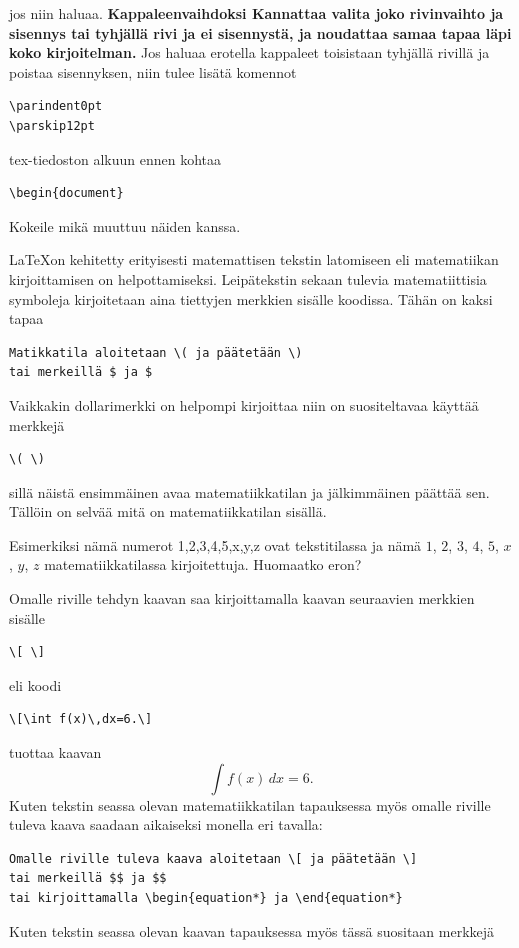 \documentclass[a4paper,12 pt]{article}
\theoremstyle{plain}
\theoremstyle{definition}
\theoremstyle{remark}
\numberwithin{equation}{section}
\numberwithin{figure}{section}
\begin{document}
\noindent jos niin haluaa. \textbf{Kappaleenvaihdoksi Kannattaa valita joko rivinvaihto ja sisennys tai tyhjällä rivi ja ei sisennystä, ja noudattaa samaa tapaa läpi koko kirjoitelman.} Jos haluaa erotella kappaleet toisistaan tyhjällä rivillä ja poistaa sisennyksen, niin tulee lisätä komennot

\begin{verbatim}
\parindent0pt
\parskip12pt
\end{verbatim}
tex-tiedoston alkuun ennen kohtaa

\begin{verbatim}
\begin{document}
\end{verbatim}
Kokeile mikä muuttuu näiden kanssa.

\LaTeX on kehitetty erityisesti matemattisen tekstin latomiseen eli matematiikan kirjoittamisen on helpottamiseksi. Leipätekstin sekaan tulevia matematiittisia symboleja kirjoitetaan aina tiettyjen merkkien sisälle koodissa. Tähän on kaksi tapaa

\begin{verbatim}
Matikkatila aloitetaan \( ja päätetään \)
tai merkeillä $ ja $ 
\end{verbatim}
Vaikkakin dollarimerkki on helpompi kirjoittaa niin on suositeltavaa käyttää merkkejä

\begin{verbatim}
\( \)    
\end{verbatim}
sillä näistä ensimmäinen avaa matematiikkatilan ja jälkimmäinen päättää sen. Tällöin on selvää mitä on matematiikkatilan sisällä.

Esimerkiksi nämä numerot  1,2,3,4,5,x,y,z ovat tekstitilassa ja nämä $1$, $2$, $3$, $4$, $5$, $x$, $y$, $z$ matematiikkatilassa kirjoitettuja. Huomaatko eron? 

Omalle riville tehdyn kaavan saa kirjoittamalla kaavan seuraavien merkkien sisälle

\begin{verbatim}
\[ \]    
\end{verbatim}
eli koodi

\begin{verbatim}
\[\int f(x)\,dx=6.\]    
\end{verbatim}
tuottaa kaavan
\[\int f(x)\,dx=6.\]    
Kuten tekstin seassa olevan matematiikkatilan tapauksessa myös omalle riville tuleva kaava saadaan aikaiseksi monella eri tavalla:

\begin{verbatim}
Omalle riville tuleva kaava aloitetaan \[ ja päätetään \]
tai merkeillä $$ ja $$ 
tai kirjoittamalla \begin{equation*} ja \end{equation*}
\end{verbatim}
Kuten tekstin seassa olevan kaavan tapauksessa myös tässä suositaan merkkejä
\end{document}
